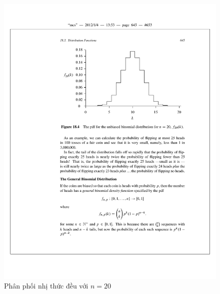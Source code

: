 \begin{frame}
	\begin{block}{}
	\begin{figure}[h] 
	  \centering
	    \includegraphics[width=.9\textwidth]{fig184.pdf}
	  \caption{Phân phối nhị thức đều với $n=20$}
	  
	\end{figure}		
	\end{block}
	
\end{frame}

